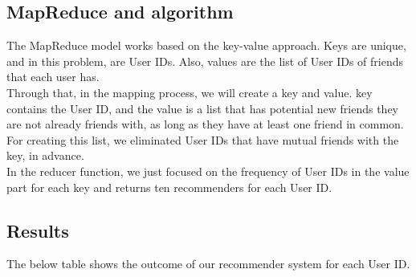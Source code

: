\documentclass[12pt]{article}
\begin{document}
\subsection{MapReduce and algorithm}
\noindent The MapReduce model works based on the key-value approach. Keys are unique, and in this problem, are User IDs. Also, values are the list of User IDs of friends that each user has. \\

\noindent Through that, in the mapping process, we will create a key and value. key contains the User ID, and the value is a list that has potential new friends they are not already friends with, as long as they have at least one friend in common. For creating this list, we eliminated User IDs that have mutual friends with the key, in advance. \\

\noindent In the reducer function, we just focused on the frequency of User IDs in the value part for each key and returns ten recommenders for each User ID.

\newpage 

\subsection{Results}

The below table shows the outcome of our recommender system for each User ID. 

\begin{table}[ht]
    \centering
    \caption{FRIEND SUGGESTIONS}
    \label{tbl:friend_suggestions}
\end{table}
\end{document}
